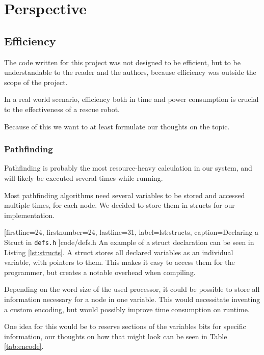 \chapter{Perspective}
\section{Efficiency}
The code written for this project was not designed to be efficient,
but to be understandable to the reader and the authors,
because efficiency was outside the scope of the project.

In a real world scenario,
efficiency both in time and power consumption is crucial to the effectiveness of a rescue robot.

Because of this we want to at least formulate our thoughts on the topic.
\subsection{Pathfinding}
Pathfinding is probably the most resource-heavy calculation in our system,
and will likely be executed several times while running.

Most pathfinding algorithms need several variables to be stored and accessed multiple times,
for each node.
We decided to store them in structs for our implementation.


[firstline=24,				%
firstnumber=24,
lastline=31,
label=lst:structs,	%
caption={Declaring a Struct  in {\tt defs.h}}
]{code/defs.h}
%
An example of a struct declaration can be seen in Listing \ref{lst:structs}.
A struct stores all declared variables as an individual variable,
with pointers to them.
This makes it easy to access them for the programmer,
but creates a notable overhead when compiling.

Depending on the word size of the used processor,
it could be possible to store all information necessary for a node in one variable.
This would necessitate inventing a custom encoding,
but would possibly improve time consumption on runtime.

One idea for this would be to reserve sections of the variables bits for specific information,
our thoughts on how that might look can be seen in Table \ref{tab:encode}.

